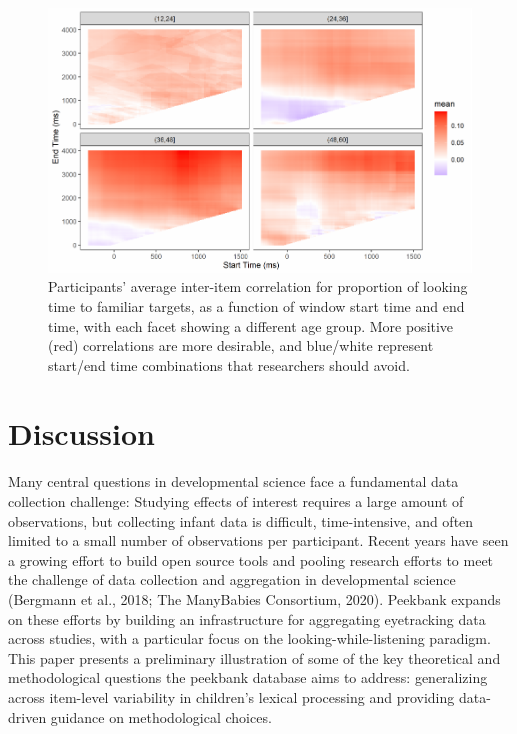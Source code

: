 \documentclass[10pt, letterpaper]{article}
\newenvironment{CodeChunk}{}{}
\begin{document}
\begin{CodeChunk}
\begin{figure}[h]

{\centering \includegraphics{figs/time_window-1} 

}

\caption[Participants' average inter-item correlation for proportion of looking time to familiar targets, as a function of window start time and end time, with each facet showing a different age group]{Participants' average inter-item correlation for proportion of looking time to familiar targets, as a function of window start time and end time, with each facet showing a different age group. More positive (red) correlations are more desirable, and blue/white represent start/end time combinations that researchers should avoid.}\label{fig:time_window}
\end{figure}
\end{CodeChunk}

\hypertarget{discussion}{%
\section{Discussion}\label{discussion}}

Many central questions in developmental science face a fundamental data
collection challenge: Studying effects of interest requires a large
amount of observations, but collecting infant data is difficult,
time-intensive, and often limited to a small number of observations per
participant. Recent years have seen a growing effort to build open
source tools and pooling research efforts to meet the challenge of data
collection and aggregation in developmental science (Bergmann et al.,
2018; The ManyBabies Consortium, 2020). Peekbank expands on these
efforts by building an infrastructure for aggregating eyetracking data
across studies, with a particular focus on the looking-while-listening
paradigm. This paper presents a preliminary illustration of some of the
key theoretical and methodological questions the peekbank database aims
to address: generalizing across item-level variability in children's
lexical processing and providing data-driven guidance on methodological
choices.
\end{document}
